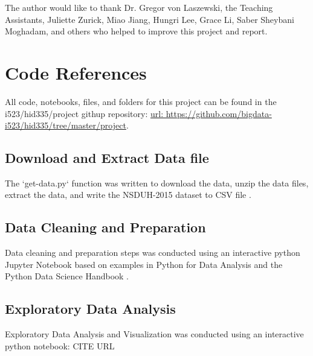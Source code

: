 \documentclass[sigconf]{acmart}
\begin{document}
\begin{acks}

The author would like to thank Dr. Gregor von Laszewski, the Teaching 
Assistants, Juliette Zurick, Miao Jiang, Hungri Lee, Grace Li, Saber Sheybani
Moghadam, and others who helped to improve this project and report.

\end{acks}


 


\appendix

\section{Code References}
All code, notebooks, files, and folders for this project can be found in the
i523/hid335/project githup repository: 
\url{url:  https://github.com/bigdata-i523/hid335/tree/master/project}.

\subsection{Download and Extract Data file}

The `get-data.py` function was written to download the data, unzip the data
files, extract the data, and write the NSDUH-2015 dataset to CSV file 
\cite{getdata17}.

\subsection{Data Cleaning and Preparation}

Data cleaning and preparation steps was conducted using an interactive python Jupyter Notebook \cite{data17} based on examples in Python for Data Analysis \cite{mckinney17} and the Python Data Science Handbook \cite{vanderplas17}.

\subsection{Exploratory Data Analysis}

Exploratory Data Analysis and Visualization was conducted using an interactive
python notebook: CITE URL
\end{document}

